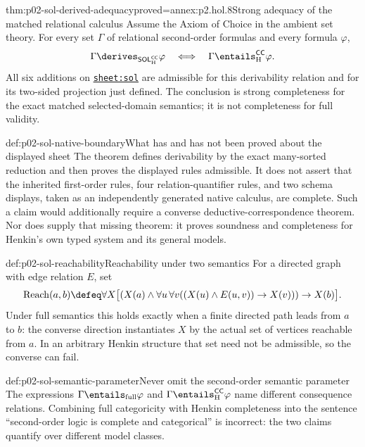 \begin{hbtheorem}{thm:p02-sol-derived-adequacy}{proved=annex:p2.hol.8}{Strong adequacy of the matched relational calculus}
Assume the Axiom of Choice in the ambient set theory.  For every set
\(\Gamma\) of relational second-order formulas and every formula \(\varphi\),
\[
 \Gamma\derives_{\mathsf{SOL}_{\mathrm H}^{\mathsf{CC}}}\varphi
 \quad\Longleftrightarrow\quad
 \Gamma\entails_{\mathrm H}^{\mathsf{CC}}\varphi.
\]
All six additions on \hyperref[sheet:sol]{\texttt{sheet:sol}} are admissible
for this derivability relation and for its two-sided projection just defined.
The conclusion is
strong completeness for the exact matched
selected-domain semantics; it is not completeness for full validity.
\end{hbtheorem}

\begin{proofboundary}{def:p02-sol-native-boundary}{What has and has not been proved about the displayed sheet}
The theorem defines derivability by the exact many-sorted reduction and then
proves the displayed rules admissible.  It does not assert that the inherited
first-order rules, four relation-quantifier rules, and two schema displays,
taken as an independently generated native calculus, are complete.  Such a
claim would additionally require a converse deductive-correspondence theorem.
Nor does \cite{Henkin1950} supply that missing theorem: it proves soundness and
completeness for Henkin's own typed system and its general models.
\end{proofboundary}

\begin{hbexample}{def:p02-sol-reachability}{Reachability under two semantics}
For a directed graph with edge relation \(E\), set
\[
 \operatorname{Reach}(a,b)\defeq
 \forall X\bigl[(X(a)\land
   \forall u\,\forall v((X(u)\land E(u,v))\to X(v)))\to X(b)\bigr].
\]
Under full semantics this holds exactly when a finite directed path leads
from \(a\) to \(b\): the converse direction instantiates \(X\) by the actual
set of vertices reachable from \(a\).  In an arbitrary Henkin structure that
set need not be admissible, so the converse can fail.
\end{hbexample}

\begin{hbwarning}{def:p02-sol-semantic-parameter}{Never omit the second-order semantic parameter}
The expressions \(\Gamma\entails_{\mathrm{full}}\varphi\) and
\(\Gamma\entails_{\mathrm H}^{\mathsf{CC}}\varphi\) name different
consequence relations.  Combining full categoricity with Henkin completeness
into the sentence ``second-order logic is complete and categorical'' is
incorrect: the two claims quantify over different model classes.
\end{hbwarning}

